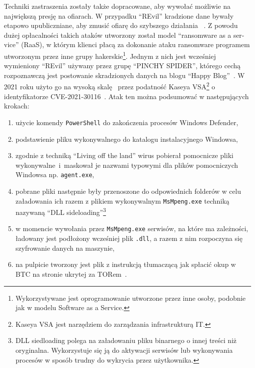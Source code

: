 Techniki zastraszenia zostały także dopracowane, aby wywołać możliwie na największą presję na ofiarach. W przypadku \foreignquote{english}{REvil} kradzione dane bywały etapowo upubliczniane, aby zmusić ofiarę do szybszego działania ~\cite{hern_ransomware_2021}.\newline
Z powodu dużej opłacalności takich ataków utworzony został model \foreignquote{english}{ransomware as a service} (RaaS), w którym klienci płacą za dokonanie ataku ransomware programem utworzonym przez inne grupy hakerskie\footnote{Wykorzystywane jest oprogramowanie utworzone przez inne osoby, podobnie jak w modelu Software as a Service.}. 
\newline
Jednym z nich jest wcześniej wymieniony \foreignquote{english}{REvil} używany przez grupę \foreignquote{english}{PINCHY SPIDER}, którego cechą rozpoznawczą jest postowanie skradzionych danych na blogu \foreignquote{english}{Happy Blog}~\cite{hern_ransomware_2021}. W 2021 roku użyto go na wysoką skalę~\cite{mcmillan_ransomware_2021} przez podatność Kaseya VSA\footnote{Kaseya VSA jest narzędziem do zarządzania infrastrukturą IT.} o identyfikatorze CVE-2021-30116~\cite{kasaya}. Atak ten można podsumować w następujących krokach:
\begin{enumerate}
    \item użycie komendy \texttt{PowerShell} do zakończenia procesów Windows Defender,
    \item podstawienie pliku wykonywalnego do katalogu instalacyjnego Windowsa,
    \item zgodnie z techniką \foreignquote{english}{Living off the land} wirus pobierał pomocnicze pliki wykonywalne~i~maskował je nazwami typowymi dla plików pomocniczych Windowsa np. \texttt{agent.exe},
    \item pobrane pliki następnie były przenoszone do odpowiednich folderów w celu załadowania ich razem z plikiem wykonywalnym \texttt{MsMpeng.exe} techniką nazywaną \foreignquote{english}{DLL sideloading}\footnote{DLL siedloading polega na załadowaniu pliku binarnego o innej treści niż oryginalna. Wykorzystuje się ją do aktywacji serwisów lub wykonywania procesów w sposób trudny do wykrycia przez użytkownika.}
    \item w momencie wywołania przez \texttt{MsMpeng.exe} serwisów, na które ma zależności, ładowany jest podłożony wcześniej plik \texttt{.dll}, a razem z nim rozpoczyna się szyfrowanie danych na maszynie,
    \item na pulpicie tworzony jest plik z instrukcją tłumaczącą jak spłacić okup w BTC na stronie ukrytej za TORem~\cite{huntresslabs_crticial_2021}.
\end{enumerate}
